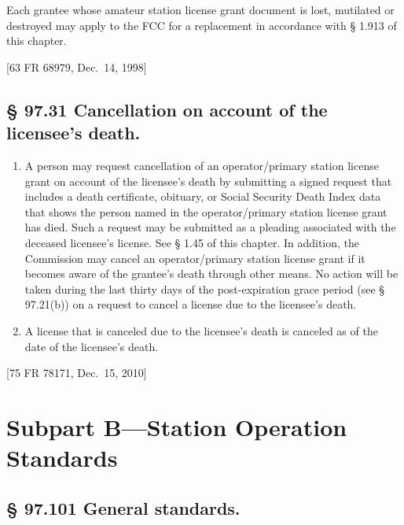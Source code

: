 \documentclass[
  letterpaper,
  DIV=11,
  numbers=noendperiod]{scrreport}
\begin{document}
Each grantee whose amateur station license grant document is lost,
mutilated or destroyed may apply to the FCC for a replacement in
accordance with § 1.913 of this chapter.

{[}63 FR 68979, Dec.~14, 1998{]}

\hypertarget{cancellation-on-account-of-the-licensees-death.}{%
\subsection*{§ 97.31 Cancellation on account of the licensee's
death.}\label{cancellation-on-account-of-the-licensees-death.}}

\begin{enumerate}
\def\labelenumi{(\alph{enumi})}
\item
  A person may request cancellation of an operator/primary station
  license grant on account of the licensee's death by submitting a
  signed request that includes a death certificate, obituary, or Social
  Security Death Index data that shows the person named in the
  operator/primary station license grant has died. Such a request may be
  submitted as a pleading associated with the deceased licensee's
  license. See § 1.45 of this chapter. In addition, the Commission may
  cancel an operator/primary station license grant if it becomes aware
  of the grantee's death through other means. No action will be taken
  during the last thirty days of the post-expiration grace period (see §
  97.21(b)) on a request to cancel a license due to the licensee's
  death.
\item
  A license that is canceled due to the licensee's death is canceled as
  of the date of the licensee's death.
\end{enumerate}

{[}75 FR 78171, Dec.~15, 2010{]}

\hypertarget{subpart-bstation-operation-standards}{%
\section*{Subpart B---Station Operation
Standards}\label{subpart-bstation-operation-standards}}


\hypertarget{97.101}{%
\subsection*{§ 97.101 General standards.}\label{97.101}}
\end{document}

